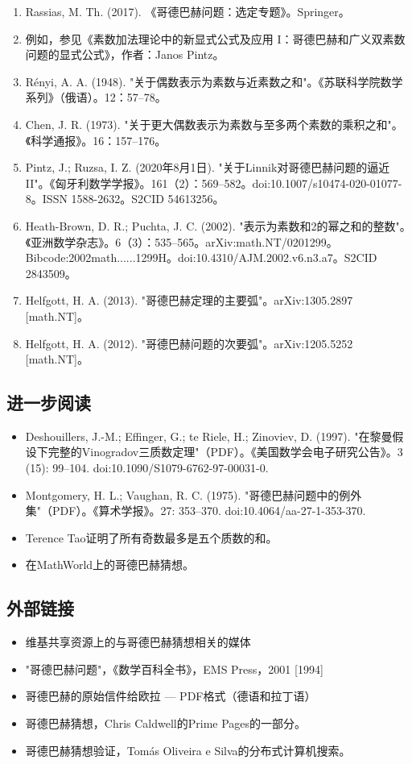 \begin{enumerate}
\item Rassias, M. Th. (2017). 《哥德巴赫问题：选定专题》。Springer。  
\item 例如，参见《素数加法理论中的新显式公式及应用 I：哥德巴赫和广义双素数问题的显式公式》，作者：Janos Pintz。
\item Rényi, A. A. (1948). "关于偶数表示为素数与近素数之和"。《苏联科学院数学系列》（俄语）。12：57–78。  
\item Chen, J. R. (1973). "关于更大偶数表示为素数与至多两个素数的乘积之和"。《科学通报》。16：157–176。  
\item Pintz, J.; Ruzsa, I. Z. (2020年8月1日). "关于Linnik对哥德巴赫问题的逼近 II"。《匈牙利数学学报》。161（2）：569–582。doi:10.1007/s10474-020-01077-8。ISSN 1588-2632。S2CID 54613256。  
\item Heath-Brown, D. R.; Puchta, J. C. (2002). "表示为素数和2的幂之和的整数"。《亚洲数学杂志》。6（3）：535–565。arXiv:math.NT/0201299。Bibcode:2002math......1299H。doi:10.4310/AJM.2002.v6.n3.a7。S2CID 2843509。  
\item Helfgott, H. A. (2013). "哥德巴赫定理的主要弧"。arXiv:1305.2897 [math.NT]。  
\item Helfgott, H. A. (2012). "哥德巴赫问题的次要弧"。arXiv:1205.5252 [math.NT]。




\end{enumerate}


\subsection{进一步阅读}  
\begin{itemize}
\item Deshouillers, J.-M.; Effinger, G.; te Riele, H.; Zinoviev, D. (1997). "在黎曼假设下完整的Vinogradov三质数定理"（PDF）。《美国数学会电子研究公告》。3 (15): 99–104. doi:10.1090/S1079-6762-97-00031-0.  
\item Montgomery, H. L.; Vaughan, R. C. (1975). "哥德巴赫问题中的例外集"（PDF）。《算术学报》。27: 353–370. doi:10.4064/aa-27-1-353-370.  
\item Terence Tao证明了所有奇数最多是五个质数的和。  
\item 在MathWorld上的哥德巴赫猜想。 
\end{itemize} 
\subsection{外部链接}  
\begin{itemize}
\item 维基共享资源上的与哥德巴赫猜想相关的媒体  
\item "哥德巴赫问题"，《数学百科全书》，EMS Press，2001 [1994]  
\item 哥德巴赫的原始信件给欧拉 — PDF格式（德语和拉丁语）  
\item 哥德巴赫猜想，Chris Caldwell的Prime Pages的一部分。  
\item 哥德巴赫猜想验证，Tomás Oliveira e Silva的分布式计算机搜索。
\end{itemize}